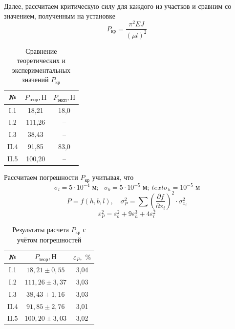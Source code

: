 \documentclass[a4paper,12pt]{article}
\begin{document}
Далее, рассчитаем критическую силу для каждого из участков и сравним со значением, полученным на установке
\[P_{кр} = \frac{\pi^2 E J}{(\mu l)^2}\]
\begin{table}[H]\label{tab: P_TeorAndExperiment}
    \centering
    \begin{tabular}{|c|c|c|}
        \hline
        {\color[HTML]{000000} №} & {\color[HTML]{000000} $P_{теор},  Н$} & {\color[HTML]{000000} $P_{эксп},  Н$} \\ \hline
        {\color[HTML]{000000} I.1}  & {\color[HTML]{000000} 18,21}  & {\color[HTML]{000000} 18,0} \\ \hline
        {\color[HTML]{000000} I.2}  & {\color[HTML]{000000} 111,26} & {\color[HTML]{000000} --}    \\ \hline
        {\color[HTML]{000000} I.3}  & {\color[HTML]{000000} 38,43}  & {\color[HTML]{000000} --}    \\ \hline
        {\color[HTML]{000000} II.4} & {\color[HTML]{000000} 91,85}  & {\color[HTML]{000000} 83,0} \\ \hline
        {\color[HTML]{000000} II.5} & {\color[HTML]{000000} 100,20} & {\color[HTML]{000000} --}    \\ \hline
    \end{tabular}
    \caption{Сравнение теоретических и экспериментальных значений $P_{кр}$}
\end{table}
Рассчитаем погрешности $P_{кр}$ учитывая, что 
\[\sigma_l = 5 \cdot 10^{-4} \text{ м}; \text{ } \sigma_b = 5 \cdot 10^{-5} \text{ м};\ text{ } \sigma_h = 10^{-5} \text{ м}\]
\[P = f(h, b, l), \quad \sigma_{P}^2 = \sum (\frac{\partial f}{\partial x_i})^2 \cdot \sigma_{x_i}^2\]
\[\varepsilon_P^2 = \varepsilon_b^2 + 9\varepsilon_h^3 + 4\varepsilon_l^2\]


\begin{table}[H]\label{tab: Pogreshnost}
    \centering
    \begin{tabular}{|c|c|c|}
        \hline
        {\color[HTML]{000000} №} & {\color[HTML]{000000} $P_{теор},  Н$} & {\color[HTML]{000000} $\varepsilon_P, \text{ \%}$} \\ \hline
        {\color[HTML]{000000} I.1}  & {\color[HTML]{000000} $18,21 \pm 0,55$}  & {\color[HTML]{000000} 3,04} \\ \hline
        {\color[HTML]{000000} I.2}  & {\color[HTML]{000000} $111,26 \pm 3,37$} & {\color[HTML]{000000} 3,03} \\ \hline
        {\color[HTML]{000000} I.3}  & {\color[HTML]{000000} $38,43 \pm 1,16$}  & {\color[HTML]{000000} 3,03} \\ \hline
        {\color[HTML]{000000} II.4} & {\color[HTML]{000000} $91,85 \pm 2,76$}  & {\color[HTML]{000000} 3,01} \\ \hline
        {\color[HTML]{000000} II.5} & {\color[HTML]{000000} $100,20 \pm 3,03$} & {\color[HTML]{000000} 3,02} \\ \hline
    \end{tabular}
    \caption{Результаты расчета $P_{кр}$ с учётом погрешностей}
\end{table}
\end{document}
